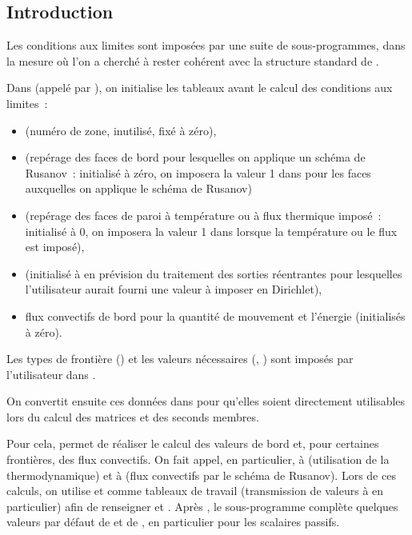 \subsection*{Introduction}

Les conditions aux limites sont imposées par une suite de sous-programmes,
dans la mesure où l'on a cherché à rester cohérent avec la structure
standard de \CS.

Dans  (appelé par ), on initialise les tableaux
avant le calcul des conditions aux limites~:
\begin{itemize}
\item {} (numéro de zone, inutilisé, fixé à zéro),
\item {} (repérage des faces de bord pour
lesquelles on applique un schéma de Rusanov~: initialisé à zéro,
on imposera la valeur 1 dans  pour les faces auxquelles on applique le schéma
de Rusanov)
\item {} (repérage des faces de paroi à température ou
à flux thermique imposé~: initialisé à 0, on imposera la valeur 1
dans  lorsque la température ou le flux est imposé),
\item {} (initialisé à  en prévision
du traitement des sorties réentrantes pour lesquelles l'utilisateur
aurait fourni une valeur à imposer en Dirichlet),
\item flux convectifs de bord pour la quantité de mouvement et l'énergie
(initialisés à zéro).
\end{itemize}


\bigskip
Les types de frontière () et les valeurs nécessaires
(, ) sont imposés par l'utilisateur dans .

On convertit ensuite ces données dans  pour qu'elles
soient directement utilisables lors du calcul des matrices et des seconds membres.

Pour cela,  permet de réaliser le calcul des valeurs de bord et,
pour certaines frontières, des flux convectifs. On fait appel,
en particulier,
à  (utilisation de la thermodynamique) et à 
(flux convectifs par le schéma de Rusanov). Lors de ces calculs, on utilise
 et  comme tableaux de travail (transmission de valeurs
à  en particulier) afin de renseigner  et
.
Après ,
le sous-programme  complète quelques valeurs par défaut
de  et de , en particulier pour les scalaires passifs.

